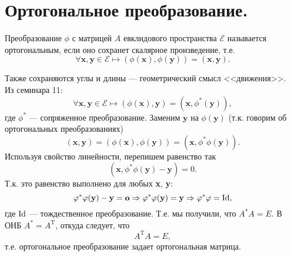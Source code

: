\section{Ортогональное преобразование.}
\begin{definition}
Преобразование $\phi$ с матрицей $A$ евклидового пространства $\mathcal{E}$ называется ортогональным, если оно сохранет скалярное произведение, т.е.
$$
\forall \textbf{x}, \textbf{y}\in\mathcal{E}\longmapsto(\phi(\textbf{x}), \phi(\textbf{y})) = (\textbf{x}, \textbf{y}).
$$
\end{definition}
\noindent Также сохраняются углы и длины --- геометрический смысл <<движения>>.\\

Из семинара 11:
$$
\forall \textbf{x}, \textbf{y} \in \mathcal{E} \longmapsto (\phi(\textbf{x}), \textbf{y}) = (\textbf{x}, \phi^*(\textbf{y})),
$$
где $\phi^*$ --- сопряженное преобразование. Заменим $\textbf{y}$ на $\phi(\textbf{y})$ (т.к. говорим об ортогональных преобразованиях)
$$
(\textbf{x}, \textbf{y})=(\phi(\textbf{x}), \phi(\textbf{y}))=(\textbf{x}, \phi^*\phi(\textbf{y})).
$$
Используя свойство линейности, перепишем равенство так
$$
(\textbf{x}, \phi^*\phi(\textbf{y})-\textbf{y})=0.
$$
Т.к. это равенство выполнено для любых \textbf{x}, \textbf{y}:
$$
\varphi^*\varphi(\textbf{y})-\textbf{y}=\textbf{o}\Rightarrow\varphi^*\varphi(\textbf{y})=\textbf{y}\Rightarrow\varphi^*\varphi=\operatorname{\mathop{Id}},
$$
где $\operatorname{\mathop{Id}}$ --- тождественное преобразование. Т.е. мы получили, что $A^*A=E$.
В ОНБ $A^*=A^{\text{T}}$, откуда следует, что
$$
\boxed{A^{\text{T}}A=E},
$$
т.е. ортогональное преобразование задает ортогональная матрица.